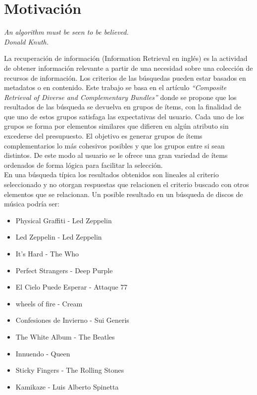 \section{Motivación}
{\begin{small}%
\begin{flushright}%
\it An algorithm must be seen to be believed.\\Donald Knuth.
\end{flushright}%
\end{small}%
\vspace{.5cm}}
La recuperación de información (Information Retrieval en inglés) es la actividad de obtener información relevante a partir de una necesidad sobre una colección de recursos de información.  Los criterios de las búsquedas pueden estar basados en metadatos o en contenido.    
Este trabajo se basa en el artículo \textit{\textquotedblleft Composite Retrieval of Diverse and Complementary Bundles\textquotedblright}\cite{compositeRetrival} donde se propone que los resultados de las búsqueda se devuelva en grupos de ítems, con la finalidad de que uno de estos grupos satisfaga las expectativas del usuario. Cada uno de los grupos se forma por elementos similares que difieren en algún atributo sin excederse del presupuesto. El objetivo es generar grupos de ítems complementarios lo más cohesivos posibles y que los grupos entre si sean distintos. De este modo al usuario se le ofrece una gran variedad de ítems ordenados de forma lógica para facilitar la selección.\\
En una búsqueda típica los resultados obtenidos son lineales al criterio seleccionado y no otorgan respuestas que relacionen el criterio buscado con otros elementos que se relacionan. Un posible resultado en un búsqueda de discos de música podría ser:\\
\begin{itemize}
  \item Physical Graffiti - Led Zeppelin
  \item Led Zeppelin - Led Zeppelin
  \item It's Hard - The Who
  \item Perfect Strangers - Deep Purple
  \item El Cielo Puede Esperar - Attaque 77
  \item wheels of fire - Cream
  \item Confesiones de Invierno - Sui Generis
  \item The White Album - The Beatles
  \item Innuendo - Queen
  \item Sticky Fingers - The Rolling Stones
  \item Kamikaze - Luis Alberto Spinetta
\end{itemize}

